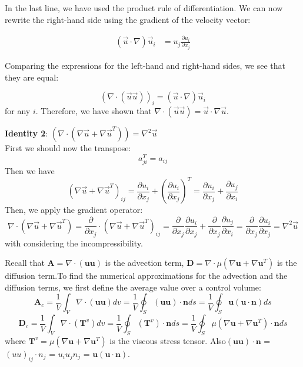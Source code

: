 \documentclass[11pt]{article} %
\begin{document}
In the last line, we have used the product rule of differentiation. We can now rewrite the right-hand side using the gradient of the velocity vector:

$$ \begin{aligned} (\vec{u}\cdot \nabla)\vec{u}_i &= u_j\frac{\partial u_i}{\partial x_j} \end{aligned} $$

Comparing the expressions for the left-hand and right-hand sides, we see that they are equal:

$$ (\nabla \cdot (\vec{u}\vec{u}))_i = (\vec{u}\cdot \nabla)\vec{u}_i $$
for any $i$. Therefore, we have shown that $\nabla \cdot (\vec{u}\vec{u}) = \vec{u} \cdot \nabla \vec{u}$.\par

\textbf{Identity 2}: $ (\nabla \cdot (\nabla\vec{u} +\nabla\vec{u}^{T})) = \nabla^{2}\vec{u}$\\
 First we should now the transpose:
 $$ a_{ji}^{T} = a_{ij} $$
 Then we have
 $$
  (\nabla\vec{u} +\nabla\vec{u}^{T})_{ij}= \frac{\partial u_{i}}{\partial x_{j}}+\left(\frac{\partial u_{i}}{\partial x_{j}}\right)^{T}= \frac{\partial u_{i}}{\partial x_{j}}+ \frac{\partial u_{j}}{\partial x_{i}}
 $$
 Then, we apply the gradient operator:
 $$
 \nabla \cdot (\nabla\vec{u} +\nabla\vec{u}^{T})=\frac{\partial}{\partial x_{j}}\cdot (\nabla\vec{u} +\nabla\vec{u}^{T})_{ij}=\frac{\partial}{\partial x_{j}}\frac{\partial u_{i}}{\partial x_{j}}+\frac{\partial}{\partial x_{j}}\frac{\partial u_{j}}{\partial x_{i}}=\frac{\partial}{\partial x_{j}}\frac{\partial u_{i}}{\partial x_{j}} =\nabla^{2}\vec{u}
 $$with considering the incompressibility.\par
 Recall that $\textbf{A}=\nabla \cdot (\textbf{uu})$ is the advection term, $\textbf{D} =\nabla \cdot \mu(\nabla \textbf{u}+\nabla\textbf{u}^{T}) $ is the diffusion term.To find the numerical approximations for the advection and the diffusion terms, we first define the average value over a control volume:
\begin{equation}
\textbf{A}_{c} = \frac{1}{V}  \int_{V} \nabla \cdot (\textbf{uu})dv=\frac{1}{V}  \oint_{S}  (\textbf{uu}) \cdot \textbf{n}ds = \frac{1}{V}  \oint_{S}  \textbf{u}(\textbf{u} \cdot \textbf{n})ds
\end{equation}
\begin{equation}
\textbf{D}_{c} = \frac{1}{V}  \int_{V} \nabla \cdot (\textbf{T}^{v})dv=\frac{1}{V}  \oint_{S}  (\textbf{T}^{v}) \cdot \textbf{n}ds=\frac{1}{V}  \oint_{S}  \mu(\nabla \textbf{u}+\nabla\textbf{u}^{T})  \cdot \textbf{n}ds
\end{equation}where $\textbf{T}^{v} =\mu(\nabla \textbf{u}+\nabla\textbf{u}^{T}) $ is the viscous stress tensor. Also$ (\textbf{uu}) \cdot \textbf{n}$ = $(uu)_{ij}\cdot n_{j}$ = $u_{i}u_j n_j$ = $\textbf{u}(\textbf{u} \cdot \textbf{n})$.\par
\end{document}
